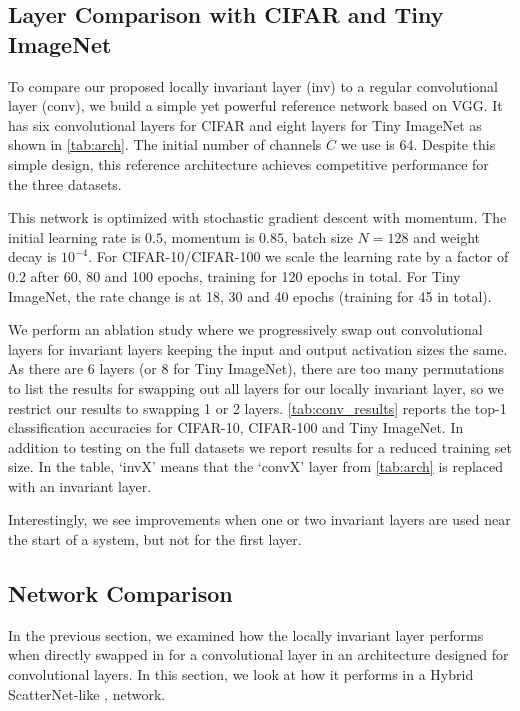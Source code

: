 \subsection{Layer Comparison with CIFAR and Tiny ImageNet}\label{sec:conv_exp}
To compare our proposed locally invariant layer (inv) to a regular convolutional
layer (conv), we build a simple yet powerful reference network based on VGG.
It has six convolutional layers for CIFAR and eight layers for Tiny ImageNet as shown in
\autoref{tab:arch}. The initial number of channels $C$ we use is 64. Despite
this simple design, this reference architecture achieves competitive performance
for the three datasets.

This network is optimized with stochastic gradient descent with momentum. The
initial learning rate is $0.5$, momentum is $0.85$, batch size $N=128$ and
weight decay is $10^{-4}$. For CIFAR-10/CIFAR-100 we scale the learning rate by
a factor of 0.2 after 60, 80 and 100 epochs, training for 120 epochs in total.
For Tiny ImageNet, the rate change is at 18, 30 and 40 epochs (training for 45 in total).



We perform an ablation study where we progressively swap out convolutional
layers for invariant layers keeping the input and output activation sizes the
same. As there are 6 layers (or 8 for Tiny ImageNet), there are too many
permutations to list the results for swapping out all layers for our locally
invariant layer, so we restrict our results to swapping 1 or 2 layers. 
\autoref{tab:conv_results} reports the top-1 classification accuracies for
CIFAR-10, CIFAR-100 and Tiny ImageNet. In addition to testing on the full
datasets we report results for a reduced training set size. In the table, `invX'
means that the `convX' layer from \autoref{tab:arch} is replaced with an 
invariant layer.

Interestingly, we see improvements when one or two invariant layers are used near the
start of a system, but not for the first layer. 


\subsection{Network Comparison}\label{sec:scat_exp}
In the previous section, we examined how the locally invariant layer performs when
directly swapped in for a convolutional layer in an architecture designed
for convolutional layers. In this section, we look at how
it performs in a Hybrid ScatterNet-like \cite{oyallon_hybrid_2017,oyallon_scaling_2017},
network.

